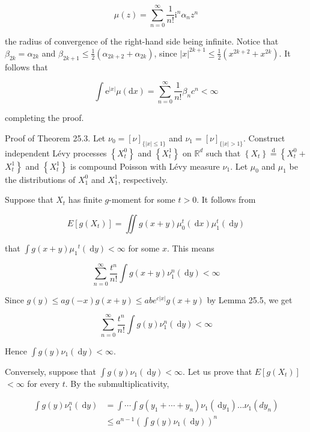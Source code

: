 \documentclass[a4paper,12pt]{article}
\begin{document}
$$
    \widehat{\mu}(z)=\sum_{n=0}^{\infty} \frac{1}{n !} \mathrm{i}^{n} \alpha_{n} z^{n}
$$

the radius of convergence of the right-hand side being infinite. Notice that $\beta_{2 k}=\alpha_{2 k}$ and $\beta_{2 k+1} \leq \frac{1}{2}\left(\alpha_{2 k+2}+\alpha_{2 k}\right)$, since $|x|^{2 k+1} \leq \frac{1}{2}\left(x^{2 k+2}+x^{2 k}\right)$. It follows that

$$
    \int \mathrm{e}^{|x|} \mu(\mathrm{d} x)=\sum_{n=0}^{\infty} \frac{1}{n !} \beta_{n} c^{n}<\infty
$$

completing the proof.

Proof of Theorem 25.3. Let $\nu_{0}=[\nu]_{\{|x| \leq 1\}}$ and $\nu_{1}=[\nu]_{\{|x|>1\}}$. Construct independent Lévy processes $\left\{X_{t}^{0}\right\}$ and $\left\{X_{t}^{1}\right\}$ on $\mathbb{R}^{d}$ such that $\left\{X_{t}\right\} \stackrel{\mathrm{d}}{=}\left\{X_{t}^{0}+\right.$ $\left.X_{t}^{1}\right\}$ and $\left\{X_{t}^{1}\right\}$ is compound Poisson with Lévy measure $\nu_{1}$. Let $\mu_{0}$ and $\mu_{1}$ be the distributions of $X_{1}^{0}$ and $X_{1}^{1}$, respectively.

Suppose that $X_{t}$ has finite $g$-moment for some $t>0$. It follows from

$$
    E\left[g\left(X_{t}\right)\right]=\iint g(x+y) \mu_{0}^{t}(\mathrm{~d} x) \mu_{1}^{t}(\mathrm{~d} y)
$$

that $\int g(x+y) \mu_{1}{ }^{t}(\mathrm{~d} y)<\infty$ for some $x$. This means

$$
    \sum_{n=0}^{\infty} \frac{t^{n}}{n !} \int g(x+y) \nu_{1}^{n}(\mathrm{~d} y)<\infty
$$

Since $g(y) \leq a g(-x) g(x+y) \leq a b e^{c|x|} g(x+y)$ by Lemma 25.5, we get


\begin{equation*}
    \sum_{n=0}^{\infty} \frac{t^{n}}{n !} \int g(y) \nu_{1}^{n}(\mathrm{~d} y)<\infty \tag{25.4}
\end{equation*}


Hence $\int g(y) \nu_{1}(\mathrm{~d} y)<\infty$.

Conversely, suppose that $\int g(y) \nu_{1}(\mathrm{~d} y)<\infty$. Let us prove that $E\left[g\left(X_{t}\right)\right]$ $<\infty$ for every $t$. By the submultiplicativity,

$$
    \begin{aligned}
        \int g(y) \nu_{1}^{n}(\mathrm{~d} y) & =\int \cdots \int g\left(y_{1}+\cdots+y_{n}\right) \nu_{1}\left(\mathrm{~d} y_{1}\right) \ldots \nu_{1}\left(d y_{n}\right) \\
                                             & \leq a^{n-1}\left(\int g(y) \nu_{1}(\mathrm{~d} y)\right)^{n}
    \end{aligned}
$$
\end{document}
